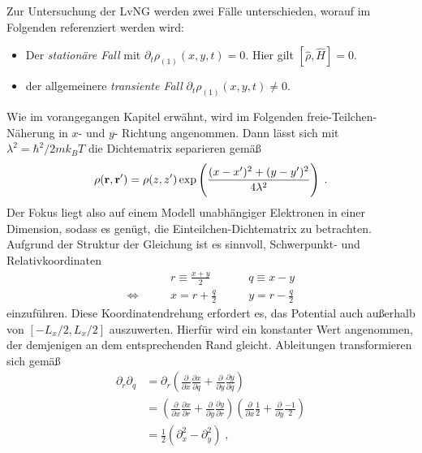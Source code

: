 Zur Untersuchung der LvNG werden zwei Fälle unterschieden, worauf im Folgenden referenziert werden wird:
\begin{itemize}
  \item Der \emph{stationäre Fall} mit $\partial_t \rho_{(1)}(x,y,t) = 0$. Hier gilt ${\left[\hat{\rho} , \hat{H}\right]=0}$.
  \item der allgemeinere \emph{transiente Fall} $\partial_t \rho_{(1)}(x,y,t) \neq 0$.
\end{itemize}
Wie im vorangegangen Kapitel erwähnt, wird im Folgenden freie-Teilchen-Näherung in $x$- und $y$- Richtung angenommen. Dann lässt sich mit $\lambda^2 = \hbar^2/2mk_B T$ die Dichtematrix separieren \cite{grubin1993transport} gemäß
\begin{equation}
  \rho(\vb{r},\vb{r}') = \rho({z},{z}') \exp\left( \frac{(x-x')^2 + (y-y')^2}{4\lambda^2}\right) \; .
\end{equation}
Der Fokus liegt also auf einem Modell unabhängiger Elektronen in einer Dimension, sodass es genügt, die Einteilchen-Dichtematrix zu betrachten.
Aufgrund der Struktur der Gleichung ist es sinnvoll, Schwerpunkt- und Relativkoordinaten
\begin{equation}
  \begin{aligned}
    &r \equiv \frac{x+y}{2} \qquad &q \equiv x-y \\
    \Leftrightarrow\qquad &x = r+\frac{q}{2} \qquad &y = r-\frac{q}{2}
  \end{aligned}
  \label{eq:gedrehteKoordinaten}
\end{equation}
einzuführen. Diese Koordinatendrehung erfordert es, das Potential auch außerhalb von $[-L_x/2, L_x/2]$ auszuwerten. Hierfür wird ein konstanter Wert angenommen, der demjenigen an dem entsprechenden Rand gleicht.
Ableitungen transformieren sich gemäß
\begin{equation*}
  \begin{aligned}
    \partial_r \partial_q  &= \partial_r \left( \frac{\partial}{\partial x} \frac{\partial x}{\partial q} + \frac{\partial}{\partial y} \frac{\partial y}{\partial q}\right) \\
     &= \left( \frac{\partial}{\partial x} \frac{\partial x}{\partial r} + \frac{\partial}{\partial y} \frac{\partial y}{\partial r}\right) \left( \frac{\partial}{\partial x} \frac{1}{2} + \frac{\partial}{\partial y} \frac{-1}{2}\right)\\
    &=  \frac{1}{2}(\partial_x^2 - \partial_y^2) \; ,
  \end{aligned}
\end{equation*}
